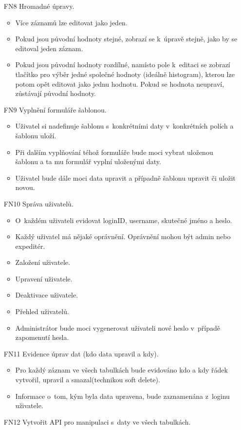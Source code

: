 \documentclass[thesis=B,czech]{FITthesis}[2012/06/26]
\begin{document}
\begin{enumerate}
	\item[FN8] Hromadné úpravy.
	\begin{itemize}
		\item Více záznamů lze editovat jako jeden. 
		\item Pokud jsou původní hodnoty stejné, zobrazí se k~úpravě stejně, jako by se editoval jeden záznam. 
		\item Pokud jsou původní hodnoty rozdílné, namísto pole k~editaci se zobrazí tlačítko pro výběr jedné společné hodnoty (ideálně histogram), kterou lze potom opět editovat jako jednu hodnotu. Pokud se hodnota neupraví, zůstávají původní hodnoty.
	\end{itemize}
	\item[FN9] Vyplnění formuláře šablonou.
	\begin{itemize}
		\item Uživatel si nadefinuje šablonu s~konkrétními daty v~konkrétních polích a šablonu uloží. 
		\item Při dalším vyplňování téhož formuláře bude moci vybrat uloženou šablonu a ta mu formulář vyplní uloženými daty. 
		\item Uživatel bude dále moci data upravit a případně šablonu upravit či uložit novou.
	\end{itemize}
	\item[FN10] Správa uživatelů.
	\begin{itemize}
		\item O~každém uživateli evidovat loginID, username, skutečné jméno a heslo.
		\item Každý uživatel má nějaké oprávnění. Oprávnění mohou být admin nebo expeditér.
		\item Založení uživatele.
		\item Upravení uživatele.
		\item Deaktivace uživatele.
		\item Přehled uživatelů.
		\item Administrátor bude moci vygenerovat uživateli nové heslo v~případě zapomenutí hesla.
	\end{itemize}
	\item[FN11] Evidence úprav dat (kdo data upravil a kdy).
	\begin{itemize}
		\item Pro každý záznam ve všech tabulkách bude evidováno kdo a kdy řádek vytvořil, upravil a smazal(technikou soft delete).
		\item Informace o~tom, kým byla data upravena, bude zaznamenána z~loginu uživatele.	
	\end{itemize}
	\item[FN12] Vytvořit API pro manipulaci s~daty ve všech tabulkách.
\end{enumerate}
\end{document}
